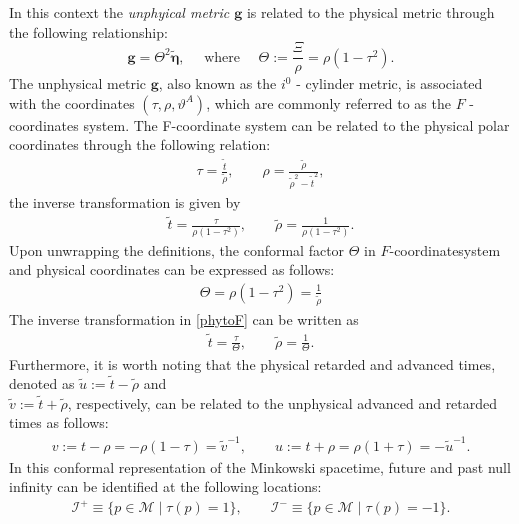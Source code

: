 In this context the \textit{unphyical metric $\boldsymbol{g}$} is related to the physical metric through the following relationship:
\begin{equation}\label{eq:gandtheta}
\boldsymbol{g}=\Theta^2 \tilde{\boldsymbol{\eta}}, \quad \text { where } \quad \Theta:=\frac{\Xi}{\rho}=\rho\left(1-\tau^2\right).
\end{equation}
The unphysical metric $\boldsymbol{g}$, also known as the $i^0$ - cylinder metric, is associated with the coordinates $(\tau, \rho, \vartheta^A)$, which are commonly referred to as the $F$ - coordinates system.
The F-coordinate system can be related to the physical polar coordinates through the following relation:
\begin{align}\label{Ftophys}
\tau = \frac{\tilde{t}}{\tilde{\rho}}, \qquad \rho = \frac{\tilde{\rho}}{\tilde{\rho}^2-\tilde{t}^2},
\end{align}
the inverse transformation is given by
\begin{align}\label{phytoF}
\tilde{t} = \frac{\tau}{\rho (1-\tau^2)}, \qquad \tilde{\rho}=\frac{1}{\rho (1-\tau^2)}.
\end{align}
Upon unwrapping the definitions, the conformal factor $\Theta$ in $F$-coordinatesystem and physical coordinates can be expressed as follows:
\begin{align}
\Theta = \rho (1-\tau^2) = \frac{1}{\tilde{\rho}}
\end{align}
The inverse transformation in \eqref{phytoF} can be written as
\begin{align}
\tilde{t}=\frac{\tau}{\Theta}, \qquad \tilde{\rho}= \frac{1}{\Theta}.
\end{align}
Furthermore, it is worth noting that the physical retarded and advanced times, denoted as $\tilde{u}:=\tilde{t}- \tilde{\rho}$ and 
\\$ \tilde{v}:= \tilde{t}+ \tilde{\rho}$, respectively, can be related to the unphysical advanced and retarded times as follows:
\begin{align}\label{eq:UnphysPhysAdvRet}
v:=t-\rho=-\rho(1-\tau)=\tilde{v}^{-1}, \qquad u:=t+\rho=\rho(1+\tau)=-\tilde{u}^{-1}.
\end{align}
In this conformal representation of the Minkowski spacetime, future and past null infinity can be identified at the following locations:
\begin{align}
\mathscr{I}^{+} \equiv \{ p \in \mathcal{M} \; \rvert\; \tau(p) =1\}, \qquad \mathscr{I}^{-} \equiv \{ p \in \mathcal{M} \; \rvert \;\tau(p) =-1\}.
\end{align}
